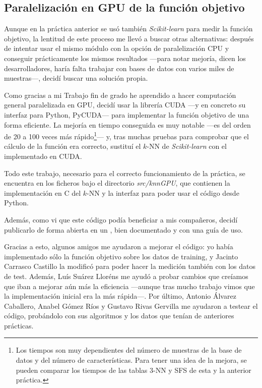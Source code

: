 \documentclass[a4paper, 11pt, titlepage]{article}
\begin{document}
    \subsection{Paralelización en GPU de la función objetivo}

    Aunque en la práctica anterior se usó también \emph{Scikit-learn} para medir la función objetivo, la lentitud de este proceso me llevó a buscar otras alternativas: después de intentar usar el mismo módulo con la opción de paralelización CPU y conseguir prácticamente los mismos resultados ---para notar mejoría, dicen los desarrolladores, haría falta trabajar con bases de datos con varios miles de muestras---, decidí buscar una solución propia.

    Como gracias a mi Trabajo fin de grado he aprendido a hacer computación general paralelizada en GPU, decidí usar la librería CUDA ---y en concreto su interfaz para Python, PyCUDA--- para implementar la función objetivo de una forma eficiente. La mejoría en tiempo conseguida es muy notable ---es del orden de 20 a 100 veces más rápido\footnote{Los tiempos son muy dependientes del número de muestras de la base de datos y del número de características. Para tener una idea de la mejora, se pueden comparar los tiempos de las tablas 3-NN y SFS de esta y la anterior práctica.}--- y, tras muchas pruebas para comprobar que el cálculo de la función era correcto, sustituí el $k$-NN de \emph{Scikit-learn} con el implementado en CUDA.

    Todo este trabajo, necesario para el correcto funcionamiento de la práctica, se encuentra en los ficheros bajo el directorio \emph{src/knnGPU}, que contienen la implementación en C del $k$-NN y la interfaz para poder usar el código desde Python.

    Además, como vi que este código podía beneficiar a mis compañeros, decidí publicarlo de forma abierta en un , bien documentado y con una guía de uso.

    Gracias a esto, algunos amigos me ayudaron a mejorar el código: yo había implementado sólo la función objetivo sobre los datos de training, y Jacinto Carrasco Castillo la modificó para poder hacer la medición también con los datos de test. Además, Luís Suárez Lloréns me ayudó a probar cambios que creíamos que iban a  mejorar aún más la eficiencia ---aunque tras mucho trabajo vimos que la implementación inicial era la más rápida---. Por último, Antonio Álvarez Caballero, Anabel Gómez Ríos y Gustavo Rivas Gervilla me ayudaron a testear el código, probándolo con sus algoritmos y los datos que tenían de anteriores prácticas.
\end{document}
